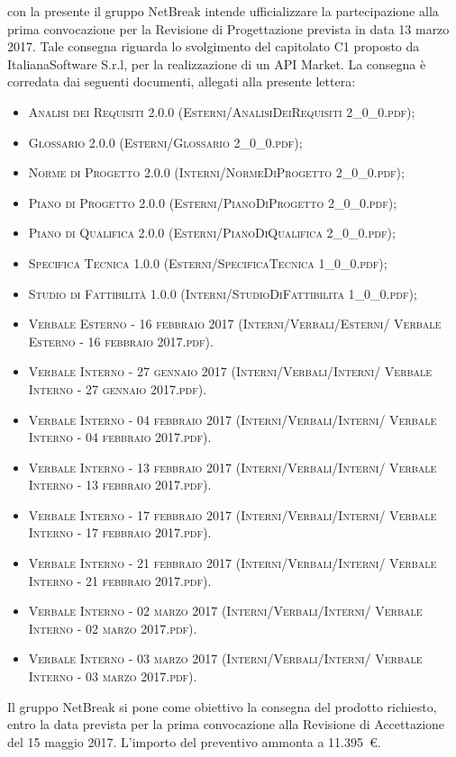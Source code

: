\documentclass[11pt,a4paper]{letter}
\begin{document}
\begin{letter}
\indent con la presente il gruppo NetBreak intende ufficializzare la partecipazione alla prima convocazione per la Revisione di Progettazione prevista in data 13 marzo 2017. Tale consegna riguarda lo svolgimento del capitolato C1 proposto da ItalianaSoftware S.r.l, per la realizzazione di un API Market.
La consegna \`e corredata dai seguenti documenti, allegati alla presente lettera:
\begin{itemize}
	\item \textsc{Analisi dei Requisiti 2.0.0 (Esterni/AnalisiDeiRequisiti 2\_0\_0.pdf)}; 
	\item \textsc{Glossario 2.0.0 (Esterni/Glossario 2\_0\_0.pdf)}; 
	\item \textsc{Norme di Progetto 2.0.0 (Interni/NormeDiProgetto 2\_0\_0.pdf)}; 
	\item \textsc{Piano di Progetto 2.0.0 (Esterni/PianoDiProgetto 2\_0\_0.pdf)}; 
	\item \textsc{Piano di Qualifica 2.0.0 (Esterni/PianoDiQualifica 2\_0\_0.pdf)}; 
	\item \textsc{Specifica Tecnica 1.0.0 (Esterni/SpecificaTecnica 1\_0\_0.pdf)}; 
	\item \textsc{Studio di Fattibilit\`a 1.0.0 (Interni/StudioDiFattibilita 1\_0\_0.pdf)}; 
	\item \textsc{Verbale Esterno - 16 febbraio 2017 (Interni/Verbali/Esterni/ Verbale Esterno - 16 febbraio 2017.pdf)}. 
	\item \textsc{Verbale Interno - 27 gennaio 2017 (Interni/Verbali/Interni/ Verbale Interno - 27 gennaio 2017.pdf)}. 
	\item \textsc{Verbale Interno - 04 febbraio 2017 (Interni/Verbali/Interni/ Verbale Interno - 04 febbraio 2017.pdf)}. 
	\item \textsc{Verbale Interno - 13 febbraio 2017 (Interni/Verbali/Interni/ Verbale Interno - 13 febbraio 2017.pdf)}. 
	\item \textsc{Verbale Interno - 17 febbraio 2017 (Interni/Verbali/Interni/ Verbale Interno - 17 febbraio 2017.pdf)}. 
	\item \textsc{Verbale Interno - 21 febbraio 2017 (Interni/Verbali/Interni/ Verbale Interno - 21 febbraio 2017.pdf)}. 
	\item \textsc{Verbale Interno - 02 marzo 2017 (Interni/Verbali/Interni/ Verbale Interno - 02 marzo 2017.pdf)}. 
	\item \textsc{Verbale Interno - 03 marzo 2017 (Interni/Verbali/Interni/ Verbale Interno - 03 marzo 2017.pdf)}. 

\end{itemize}
	Il gruppo NetBreak si pone come obiettivo la consegna del prodotto richiesto, entro la data prevista per la prima convocazione alla Revisione di Accettazione del 15 maggio 2017. L'importo del preventivo ammonta a \hbox{11.395 \euro{}.}


\end{letter}
\end{document}
